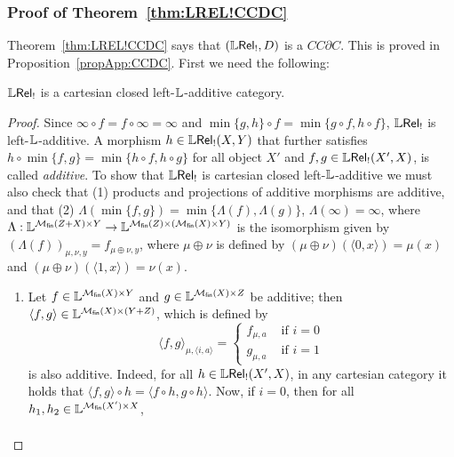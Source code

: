 



\subsubsection{Proof of Theorem~\ref{thm:LREL!CCDC}}

Theorem~\ref{thm:LREL!CCDC} says that $(\mathbb{L} \mathsf{Rel}_!,D)$ is a $CC\partial C$.
This is proved in Proposition~\ref{propApp:CCDC}.
First we need the following:

\begin{proposition}
$\mathbb{L} \mathsf{Rel}_!$ is a cartesian closed left-$\mathbb{L}$-additive category.
\end{proposition}
\begin{proof} 
Since $\infty \circ f= f\circ \infty=\infty$ and $\min\{g,h\}\circ f= \min\{g\circ f, h\circ f \}$, $\mathbb{L} \mathsf{Rel}_!$ is {left-$\mathbb{L}$-additive}.
A morphism $h\in \mathbb{L} \mathsf{Rel}_!(X,Y)$ that further satisfies $h\circ \min\{f,g\}=\min\{h\circ f, h\circ g\}$ for all object $X'$ and $f,g\in \mathbb{L} \mathsf{Rel}_!(X',X)$, is called \emph{additive}.
To show that $\mathbb{L} \mathsf{Rel}_!$ is cartesian closed left-$\mathbb{L}$-additive we must also check that (1) products and projections of additive morphisms are additive, and that (2) $\Lambda(\min\{f,g\})=\min\{\Lambda(f),\Lambda(g)\}$, $\Lambda(\infty)=\infty$, where $\Lambda:\mathbb{L}^{\mathcal{M}_{\mathsf{fin}}(Z+X)\times Y}\to \mathbb{L}^{\mathcal{M}_{\mathsf{fin}}(Z)\times( \mathcal{M}_{\mathsf{fin}}(X)\times Y)}$ is the isomorphism given by
$(\Lambda(f))_{\mu,\nu,y}= f_{\mu\oplus\nu,y}$, where 
 $\mu\oplus\nu$ is defined by $(\mu\oplus\nu)(\langle 0,x\rangle)=\mu(x)$ and $(\mu\oplus \nu)(\langle 1,x\rangle)=\nu(x)$.
	\begin{enumerate}
	\item  Let $f\in \mathbb{L}^{\mathcal{M}_{\mathsf{fin}}(X)\times Y}$ and $g\in \mathbb{L}^{\mathcal{M}_{\mathsf{fin}}(X)\times Z}$ be additive; then $\langle f,g\rangle \in \mathbb{L}^{\mathcal{M}_{\mathsf{fin}}(X)\times (Y+Z)}$, which is defined by 
	$$
	\langle f,g\rangle_{\mu,\langle i,a\rangle}= \begin{cases}
	f_{\mu,a} & \text{ if }i=0\\
	g_{\mu,a} & \text{ if }i=1
	\end{cases}
	$$
	is also additive. Indeed, for all $h\in \mathbb{L} \mathsf{Rel}_!(X',X)$, 
	in any cartesian category it holds that $\langle f,g\rangle \circ h=\langle f\circ h, g\circ h\rangle$. Now, 
		if $i=0$, then for all $h_{1},h_{2}\in \mathbb{L}^{\mathcal{M}_{\mathsf{fin}}(X')\times X}$, 
	\begin{align*}

\end{align*}
\end{enumerate}
\end{proof}
